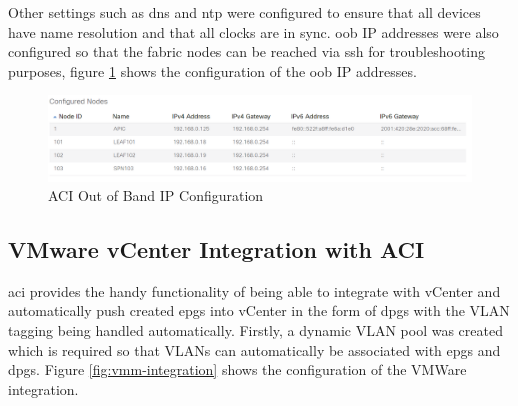 Other settings such as \gls{dns} and \gls{ntp} were configured to ensure that
all devices have name resolution and that all clocks are in sync.
\gls{oob} IP addresses were also configured so that the fabric nodes can be
reached via \gls{ssh} for troubleshooting purposes, figure \ref{fig:aci-oob-ip}
shows the configuration of the \gls{oob} IP addresses.

\begin{figure}[H]
    
    \centering
    \includegraphics[scale=0.5]{images/aci-oob-ip.png}
    
    \caption{ACI Out of Band IP Configuration}
    \label{fig:aci-oob-ip}
\end{figure}

\subsection{VMware vCenter Integration with ACI}
\gls{aci} provides the handy functionality of being able to integrate with
vCenter and automatically push created \gls{epg}s into vCenter in the form of
\gls{dpg}s with the VLAN tagging being handled automatically.
Firstly, a dynamic VLAN pool was created which is required so that VLANs can
automatically be associated with \gls{epg}s and \gls{dpg}s. Figure
\ref{fig:vmm-integration} shows the configuration of the VMWare integration.

